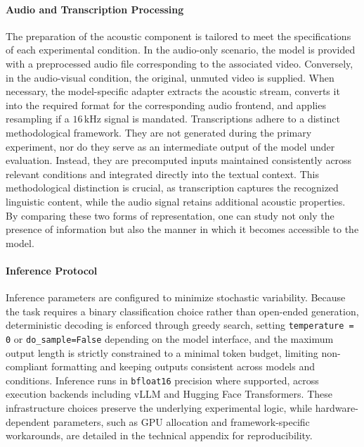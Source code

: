 \paragraph{Audio and Transcription Processing} 
The preparation of the acoustic component is tailored to meet the specifications of each experimental condition. In the audio-only scenario, the model is provided with a preprocessed audio file corresponding to the associated video. Conversely, in the audio-visual condition, the original, unmuted video is supplied. When necessary, the model-specific adapter extracts the acoustic stream, converts it into the required format for the corresponding audio frontend, and applies resampling if a \(16\,\mathrm{kHz}\) signal is mandated.
Transcriptions adhere to a distinct methodological framework. They are not generated during the primary experiment, nor do they serve as an intermediate output of the model under evaluation. Instead, they are precomputed inputs maintained consistently across relevant conditions and integrated directly into the textual context. This methodological distinction is crucial, as transcription captures the recognized linguistic content, while the audio signal retains additional acoustic properties. By comparing these two forms of representation, one can study not only the presence of information but also the manner in which it becomes accessible to the model.
\paragraph{Inference Protocol} Inference parameters are configured to minimize stochastic variability. Because the task requires a binary classification choice rather than open-ended generation, deterministic decoding is enforced through greedy search, setting \texttt{temperature = 0} or \texttt{do\_sample=False} depending on the model interface, and the maximum output length is strictly constrained to a minimal token budget, limiting non-compliant formatting and keeping outputs consistent across models and conditions.
Inference runs in \texttt{bfloat16} precision where supported, across execution backends including vLLM and Hugging Face Transformers. These infrastructure choices preserve the underlying experimental logic, while hardware-dependent parameters, such as GPU allocation and framework-specific workarounds, are detailed in the technical appendix for reproducibility.
